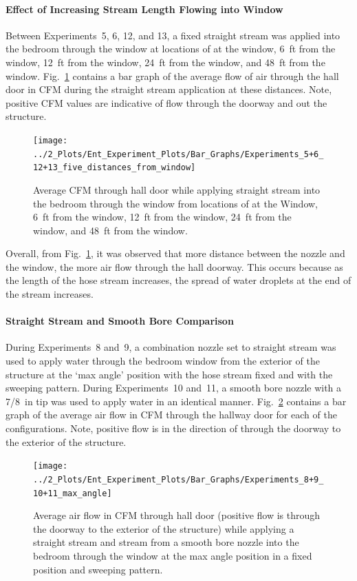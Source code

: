 \documentclass[12pt,oneside]{book}
\begin{document}
\clearpage

\paragraph{Effect of Increasing Stream Length Flowing into Window} \mbox{}

Between Experiments~5, 6, 12, and 13, a fixed straight stream was applied into the bedroom through the window at locations of at the window, 6~ft from the window, 12~ft from the window, 24~ft from the window, and 48~ft from the window. Fig.~\ref{fig:Exps5_6_12_and_13_bar_graph} contains a bar graph of the average flow of air through the hall door in CFM during the straight stream application at these distances. Note, positive CFM values are indicative of flow through the doorway and out the structure.
\\
\begin{figure}[H]
	\centering
	\texttt{[image: ../2\_Plots/Ent\_Experiment\_Plots/Bar\_Graphs/Experiments\_5+6\_12+13\_five\_distances\_from\_window]}
	\caption{Average CFM through hall door while applying straight stream into the bedroom through the window from locations of at the Window, 6~ft from the window, 12~ft from the window, 24~ft from the window, and 48~ft from the window.}
	\label{fig:Exps5_6_12_and_13_bar_graph}
\end{figure}

Overall, from Fig.~\ref{fig:Exps5_6_12_and_13_bar_graph}, it was observed that more distance between the nozzle and the window, the more air flow through the hall doorway. This occurs because as the length of the hose stream increases, the spread of water droplets at the end of the stream increases. 

\clearpage

\paragraph{Straight Stream and Smooth Bore Comparison} \mbox{}

During Experiments~8 and~9, a combination nozzle set to straight stream was used to apply water through the bedroom window from the exterior of the structure at the `max angle' position with the hose stream fixed and with the sweeping pattern. During Experiments~10 and~11, a smooth bore nozzle with a 7/8~in tip was used to apply water in an identical manner. Fig.~\ref{fig:Exps8_9_10_and_11_bar_graph} contains a bar graph of the average air flow in CFM through the hallway door for each of the configurations. Note, positive flow is in the direction of through the doorway to the exterior of the structure. 
\\
\begin{figure}[H]
	\centering
	\texttt{[image: ../2\_Plots/Ent\_Experiment\_Plots/Bar\_Graphs/Experiments\_8+9\_10+11\_max\_angle]}
	\caption{Average air flow in CFM through hall door (positive flow is through the doorway to the exterior of the structure) while applying a straight stream and stream from a smooth bore nozzle into the bedroom through the window at the max angle position in a fixed position and sweeping pattern.}
	\label{fig:Exps8_9_10_and_11_bar_graph}
\end{figure}
\end{document}

